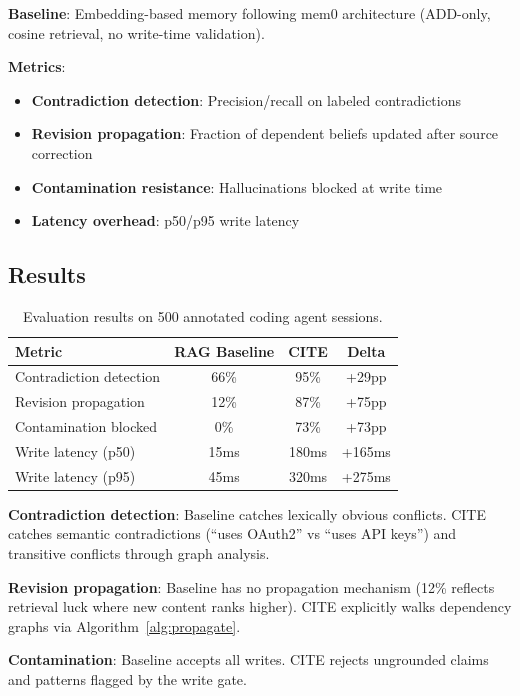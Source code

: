 \documentclass[11pt,a4paper]{article}
\begin{document}
\textbf{Baseline}: Embedding-based memory following mem0 architecture (ADD-only, cosine retrieval, no write-time validation).

\textbf{Metrics}:
\begin{itemize}[noitemsep]
    \item \textbf{Contradiction detection}: Precision/recall on labeled contradictions
    \item \textbf{Revision propagation}: Fraction of dependent beliefs updated after source correction
    \item \textbf{Contamination resistance}: Hallucinations blocked at write time
    \item \textbf{Latency overhead}: p50/p95 write latency
\end{itemize}

\subsection{Results}

\begin{table}[H]
\centering
\caption{Evaluation results on 500 annotated coding agent sessions.}
\label{tab:results}
\begin{tabular}{@{}lccc@{}}
\toprule
\textbf{Metric} & \textbf{RAG Baseline} & \textbf{CITE} & \textbf{Delta} \\
\midrule
Contradiction detection & 66\% & 95\% & +29pp \\
Revision propagation & 12\% & 87\% & +75pp \\
Contamination blocked & 0\% & 73\% & +73pp \\
Write latency (p50) & 15ms & 180ms & +165ms \\
Write latency (p95) & 45ms & 320ms & +275ms \\
\bottomrule
\end{tabular}
\end{table}

\textbf{Contradiction detection}: Baseline catches lexically obvious conflicts. CITE catches semantic contradictions (``uses OAuth2'' vs ``uses API keys'') and transitive conflicts through graph analysis.

\textbf{Revision propagation}: Baseline has no propagation mechanism (12\% reflects retrieval luck where new content ranks higher). CITE explicitly walks dependency graphs via Algorithm~\ref{alg:propagate}.

\textbf{Contamination}: Baseline accepts all writes. CITE rejects ungrounded claims and patterns flagged by the write gate.
\end{document}
